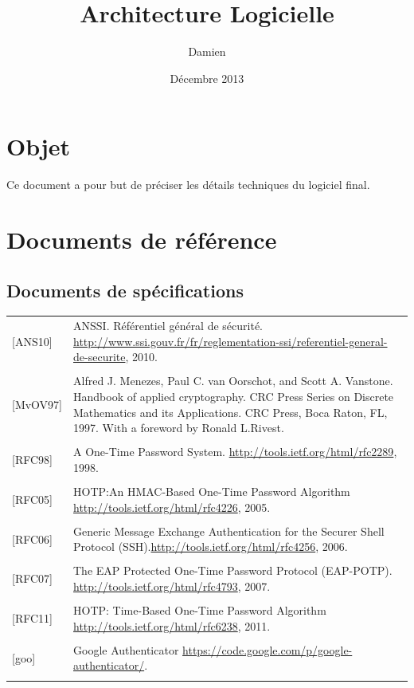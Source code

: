 \documentclass{"../../res/univ-projet"}
\title{Architecture Logicielle}
\author{\bsc{Picard} Damien}
\date{Décembre 2013}
\begin{document}
\maketitle
\section{Objet}
Ce document a pour but de préciser les détails techniques du logiciel final.

\section{Documents de référence}
\subsection{Documents de spécifications}
\begin{tabular}{p{}>{\raggedright\arraybackslash}p{13cm}}
    {[ANS10]} & {ANSSI. Référentiel général de sécurité. \href{http://www.ssi.gouv.fr/fr/reglementation-ssi/referentiel-general-de-securite}{http://www.ssi.gouv.fr/fr/reglementation-ssi/referentiel-general-de-securite}, 2010.}
    \tabularnewline
    \\
    {[MvOV97]} & {Alfred J. Menezes, Paul C. van Oorschot, and Scott A. Vanstone. Handbook of applied cryptography. CRC Press Series on Discrete Mathematics and its Applications. CRC Press, Boca Raton, FL, 1997. With a foreword by Ronald L.Rivest.}
    \tabularnewline
    \\
    {[RFC98]} & {A One-Time Password System. \href{http://tools.ietf.org/html/rfc2289}{http://tools.ietf.org/html/rfc2289}, 1998.}
    \tabularnewline
    \\
    {[RFC05]} & {HOTP:An HMAC-Based One-Time Password Algorithm \href{http://tools.ietf.org/html/rfc4226}{http://tools.ietf.org/html/rfc4226}, 2005.}
    \tabularnewline
    \\
    {[RFC06]} & {Generic Message Exchange Authentication for the Securer Shell Protocol (SSH).\href{http://tools.ietf.org/html/rfc4256}{http://tools.ietf.org/html/rfc4256}, 2006.}
    \tabularnewline
    \\
    {[RFC07]} & {The EAP Protected One-Time Password Protocol (EAP-POTP). \href{http://tools.ietf.org/html/rfc4793}{http://tools.ietf.org/html/rfc4793}, 2007.}
    \tabularnewline
    \\
    {[RFC11]} & {HOTP: Time-Based One-Time Password Algorithm \href{http://tools.ietf.org/html/rfc6238}{http://tools.ietf.org/html/rfc6238}, 2011.}
    \tabularnewline
    \\
    {[goo]} & {Google Authenticator \href{https://code.google.com/p/google-authenticator/}{https://code.google.com/p/google-authenticator/}.}
    \tabularnewline
    \\
\end{tabular}
\end{document}
